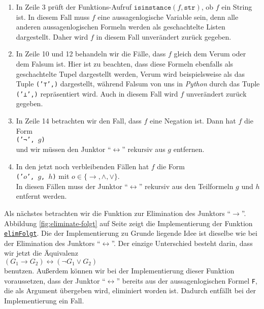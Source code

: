 \begin{enumerate}
\item In Zeile 3 prüft der Funktions-Aufruf $\texttt{isinstance}(f, \mathtt{str})$, ob $f$ ein String ist.  In diesem Fall
      muss $f$ eine aussagenlogische Variable sein, denn alle anderen aussagenlogischen Formeln werden als
      geschachtelte Listen dargestellt.  Daher wird $f$ in diesem Fall unverändert zurück gegeben.
\item In Zeile 10 und 12 behandeln wir die Fälle, dass $f$ gleich dem Verum oder dem Falsum ist.
      Hier ist zu beachten, dass diese Formeln ebenfalls als geschachtelte Tupel dargestellt werden,
      Verum wird beispielsweise als das Tuple \texttt{('⊤',)} dargestellt, während Falsum von uns in
      \textsl{Python} durch das Tuple \texttt{('⊥',)} repräsentiert wird.  Auch in diesem Fall wird $f$
      unverändert zurück gegeben.
\item In Zeile 14 betrachten wir den Fall, dass $f$ eine Negation ist.  Dann hat $f$ die Form
      \\[0.2cm]
      \hspace*{1.3cm}
      \texttt{('¬', $g$)}  
      \\[0.2cm]
      und wir müssen den Junktor ``$\leftrightarrow$'' rekursiv aus $g$ entfernen.
\item In den jetzt noch verbleibenden Fällen hat $f$ die Form
      \\[0.2cm]
      \hspace*{1.3cm}
      \texttt{('$o$', $g$, $h$)}  \quad mit $o \in \{\rightarrow, \wedge, \vee\}$.
      \\[0.2cm]
      In diesen Fällen muss der Junktor ``$\leftrightarrow$'' rekursiv aus den Teilformeln $g$ und $h$ entfernt
      werden. 
\end{enumerate}


Als nächstes betrachten wir die Funktion zur Elimination des Junktors ``$\rightarrow$''. 
Abbildung
\ref{fig:eliminate-folgt} auf Seite \pageref{fig:eliminate-folgt} zeigt die
Implementierung der Funktion
\href{https://github.com/karlstroetmann/Logic/blob/master/SetlX/knf.stlx}{\texttt{elimFolgt}}.
Die der Implementierung zu Grunde liegende Idee ist dieselbe wie bei der Elimination des
Junktors ``$\leftrightarrow$''.  Der einzige Unterschied besteht darin, dass wir jetzt die
Äquivalenz \\[0.2cm]
\hspace*{1.3cm} $(G_1 \rightarrow G_2) \leftrightarrow (\neg G_1 \vee G_2)$ \\[0.2cm]
benutzen.  Außerdem können wir bei der Implementierung dieser Funktion voraussetzen, dass der Junktor ``$\leftrightarrow$''
bereits aus der aussagenlogischen Formel \texttt{F}, die als Argument übergeben wird, eliminiert worden ist.
Dadurch entfällt bei der Implementierung ein Fall. 

